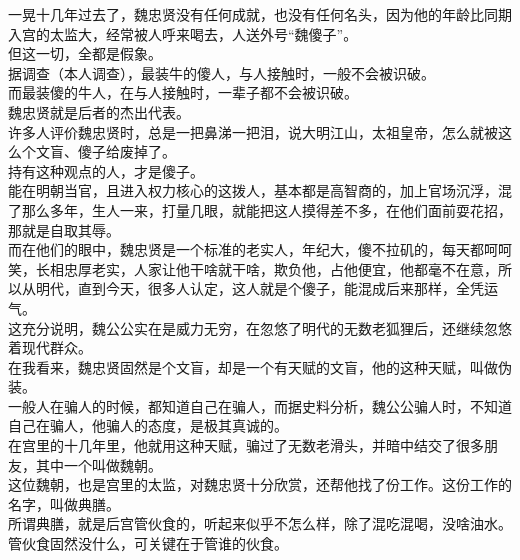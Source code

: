 \begin{multicols}{\theparacolNo}
一晃十几年过去了，魏忠贤没有任何成就，也没有任何名头，因为他的年龄比同期入宫的太监大，经常被人呼来喝去，人送外号“魏傻子”。\\

但这一切，全都是假象。\\

据调查（本人调查），最装牛的傻人，与人接触时，一般不会被识破。\\

而最装傻的牛人，在与人接触时，一辈子都不会被识破。\\

魏忠贤就是后者的杰出代表。\\

许多人评价魏忠贤时，总是一把鼻涕一把泪，说大明江山，太祖皇帝，怎么就被这么个文盲、傻子给废掉了。\\

持有这种观点的人，才是傻子。\\

能在明朝当官，且进入权力核心的这拨人，基本都是高智商的，加上官场沉浮，混了那么多年，生人一来，打量几眼，就能把这人摸得差不多，在他们面前耍花招，那就是自取其辱。\\

而在他们的眼中，魏忠贤是一个标准的老实人，年纪大，傻不拉矶的，每天都呵呵笑，长相忠厚老实，人家让他干啥就干啥，欺负他，占他便宜，他都毫不在意，所以从明代，直到今天，很多人认定，这人就是个傻子，能混成后来那样，全凭运气。\\

这充分说明，魏公公实在是威力无穷，在忽悠了明代的无数老狐狸后，还继续忽悠着现代群众。\\

在我看来，魏忠贤固然是个文盲，却是一个有天赋的文盲，他的这种天赋，叫做伪装。\\

一般人在骗人的时候，都知道自己在骗人，而据史料分析，魏公公骗人时，不知道自己在骗人，他骗人的态度，是极其真诚的。\\

在宫里的十几年里，他就用这种天赋，骗过了无数老滑头，并暗中结交了很多朋友，其中一个叫做魏朝。\\

这位魏朝，也是宫里的太监，对魏忠贤十分欣赏，还帮他找了份工作。这份工作的名字，叫做典膳。\\

所谓典膳，就是后宫管伙食的，听起来似乎不怎么样，除了混吃混喝，没啥油水。\\

管伙食固然没什么，可关键在于管谁的伙食。\\


\end{multicols}
